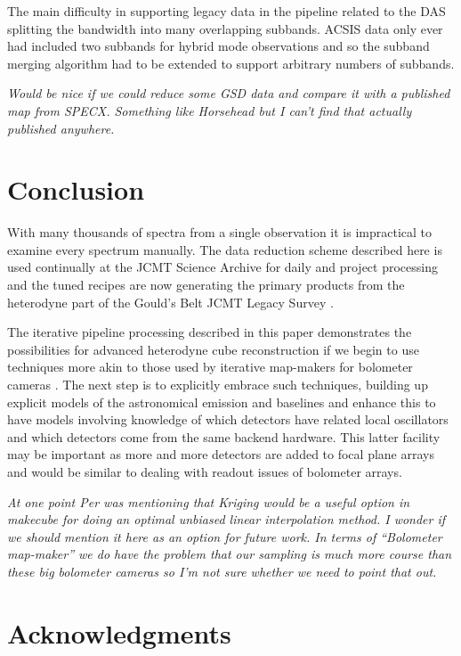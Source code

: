 \documentclass[final,authoryear,5p,times,twocolumn]{elsarticle}
\begin{document}
The main difficulty in supporting legacy data in the pipeline related
to the DAS splitting the bandwidth into many overlapping
subbands. ACSIS data only ever had included two subbands for hybrid
mode observations and so the subband merging algorithm had to be
extended to support arbitrary numbers of subbands.

\textit{Would be nice if we could reduce some GSD data and compare it with a
published map from SPECX. Something like Horsehead but I can't find
that actually published anywhere.}

\section{Conclusion}

With many thousands of spectra from a single observation it is
impractical to examine every spectrum manually. The data reduction
scheme described here is used continually at the JCMT Science Archive
\citep{2011ASPC..442..203E} for daily and project processing and the
tuned recipes are now generating the primary products from the
heterodyne part of the Gould's Belt JCMT Legacy Survey
\citep{2007PASP..119..855W}.

The iterative pipeline processing described in this paper demonstrates
the possibilities for advanced heterodyne cube reconstruction if we
begin to use techniques more akin to those used by iterative
map-makers for bolometer cameras
\citep[e.g.][]{2013MNRAS.430.2545C}. The next step is to explicitly
embrace such techniques, building up explicit models of the
astronomical emission and baselines and enhance this to have models
involving knowledge of which detectors have related local oscillators
and which detectors come from the same backend hardware. This latter
facility may be important as more and more detectors are added to
focal plane arrays and would be similar to dealing with readout issues
of bolometer arrays.

\textit{At one point Per was mentioning that Kriging would be a useful
  option in makecube for doing an optimal unbiased linear
  interpolation method. I wonder if we should mention it here as an
  option for future work. In terms of ``Bolometer map-maker'' we do
  have the problem that our sampling is much more course than these
  big bolometer cameras so I'm not sure whether we need to point that
  out.}

\section{Acknowledgments}
\end{document}
